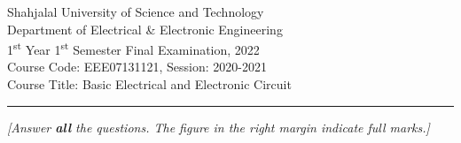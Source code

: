 
\begin{center}
	\Large{Shahjalal University of Science and Technology}\\
	\large{Department of Electrical \& Electronic Engineering}\\
	1\textsuperscript{st} Year 1\textsuperscript{st} Semester Final Examination, 2022\\
	Course Code: EEE07131121, Session: 2020-2021\\
	Course Title: Basic Electrical and Electronic Circuit\\
	
	
	
\end{center}

\vspace{1mm}
\noindent
{}

\vspace{-2.0mm}
\noindent\rule{\textwidth}{2pt}

\begin{center}
\vspace{-2.0mm}
\textit{[Answer \textbf{all} the questions. The figure in the right margin indicate full marks.]}
\end{center}
